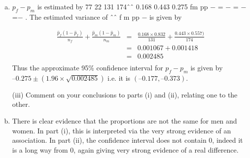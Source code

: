 \documentclass[a4paper,12pt]{article}
\begin{document}
\begin{enumerate}[(a)]
\newpage
\begin{framed}
 (ii) Compute and interpret an approximate 95\% confidence interval for the difference between the proportions of females and males having a recently recorded cholesterol measurement. (8) 

\end{framed} 
 
\item $p_f - p_m$ is estimated by 77 22 131 174ˆˆ 0.168 0.443 0.275 fm pp − = − = − =− .  The estimated variance of ˆˆ f m pp − is given by 

 \begin{eqnarray*}  
 \frac{\hat{p}_f(1-\hat{p}_f)}{n_f} + \frac{\hat{p}_m(1-\hat{p}_m)}{n_m} &=&   \frac{0.168 \times 0.832}{131} + \frac{0.443 \times 0.557)}{174} \\
 &=& 0.001067 + 0.001418 \\
 &=& 0.002485\\
 \end{eqnarray*}
Thus the approximate 95\% confidence interval for $p_f - p_m$ is given by $–0.275 \pm (1.96\times \sqrt{0.002485})$ i.e. it is $(–0.177, –0.373)$. 

\newpage
\begin{framed}
  
(iii) Comment on your conclusions to parts (i) and (ii), relating one to the other.
\end{framed} 
 
\item There is clear evidence that the proportions are not the same for men and women.  In part (i), this is interpreted via the very strong evidence of an association.  In part (ii), the confidence interval does not contain 0, indeed it is a long way from 0, again giving very strong evidence of a real difference. 
\end{enumerate}
\end{document}
